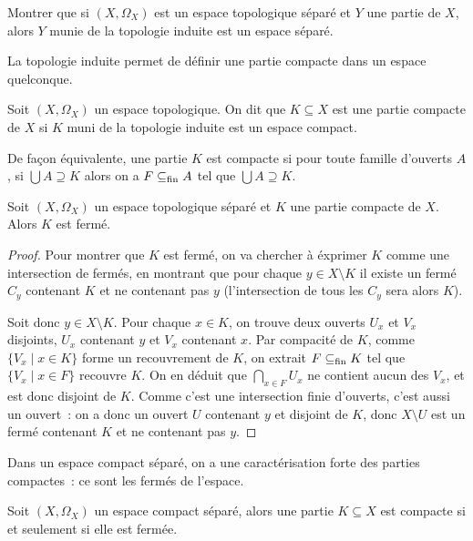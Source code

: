 \begin{exercise}
  Montrer que si $(X,\Omega_X)$ est un espace topologique séparé et $Y$ une
  partie de $X$, alors $Y$ munie de la topologie induite est un espace séparé.
\end{exercise}

La topologie induite permet de définir une partie compacte dans un espace
quelconque.

\begin{definition}
  Soit $(X,\Omega_X)$ un espace topologique. On dit que $K\subseteq X$ est une
  partie compacte de $X$ si $K$ muni de la topologie induite est un espace
  compact.
\end{definition}

\begin{remark}
  De façon équivalente, une partie $K$ est compacte si pour toute famille
  d'ouverts $A$, si $\bigcup A \supseteq K$ alors on a $F\subseteq_{\mathrm{fin}} A$ tel que
  $\bigcup A \supseteq K$.
\end{remark}

\begin{property}
  Soit $(X,\Omega_X)$ un espace topologique séparé et $K$ une partie compacte de
  $X$. Alors $K$ est fermé.
\end{property}

\begin{proof}
  Pour montrer que $K$ est fermé, on va chercher à éxprimer $K$ comme une
  intersection de fermés, en montrant que pour chaque $y\in X\setminus K$ il
  existe un fermé $C_y$ contenant $K$ et ne contenant pas $y$ (l'intersection
  de tous les $C_y$ sera alors $K$).

  Soit donc $y\in X\setminus K$. Pour chaque $x\in K$, on trouve deux ouverts
  $U_x$ et $V_x$ disjoints, $U_x$ contenant $y$ et $V_x$ contenant $x$. Par
  compacité de $K$, comme $\{V_x\mid x \in K\}$ forme un recouvrement de $K$,
  on extrait $F\subseteq_{\mathrm{fin}} K$ tel que $\{V_x\mid x \in F\}$ recouvre $K$.
  On en déduit que $\displaystyle\bigcap_{x\in F}U_x$ ne contient aucun des
  $V_x$, et est donc disjoint de $K$. Comme c'est une intersection finie
  d'ouverts, c'est aussi un ouvert~: on a donc un ouvert $U$ contenant
  $y$ et disjoint de $K$, donc $X\setminus U$ est un fermé contenant $K$ et
  ne contenant pas $y$.
\end{proof}

Dans un espace compact séparé, on a une caractérisation forte des parties
compactes~: ce sont les fermés de l'espace.

\begin{proposition}
  Soit $(X,\Omega_X)$ un espace compact séparé, alors une partie $K\subseteq X$
  est compacte si et seulement si elle est fermée.
\end{proposition}

